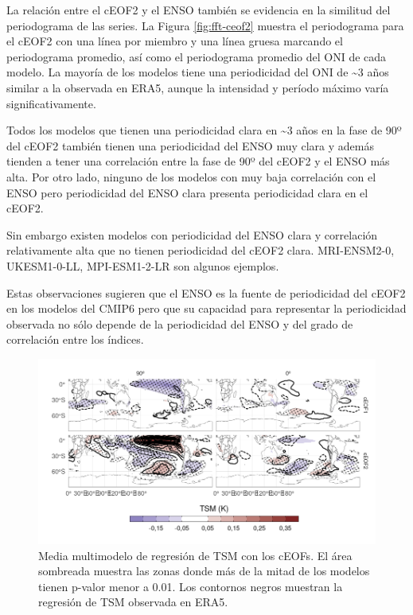 \documentclass[12pt,oneside,a4paper]{reedthesis}
\begin{document}
La relación entre el cEOF2 y el ENSO también se evidencia en la similitud del periodograma de las series.
La Figura \ref{fig:fft-ceof2} muestra el periodograma para el cEOF2 con una línea por miembro y una línea gruesa marcando el periodograma promedio, así como el periodograma promedio del ONI de cada modelo.
La mayoría de los modelos tiene una periodicidad del ONI de \textasciitilde3 años similar a la observada en ERA5, aunque la intensidad y período máximo varía significativamente.

Todos los modelos que tienen una periodicidad clara en \textasciitilde3 años en la fase de 90º del cEOF2 también tienen una periodicidad del ENSO muy clara y además tienden a tener una correlación entre la fase de 90º del cEOF2 y el ENSO más alta.
Por otro lado, ninguno de los modelos con muy baja correlación con el ENSO pero periodicidad del ENSO clara presenta periodicidad clara en el cEOF2.

Sin embargo existen modelos con periodicidad del ENSO clara y correlación relativamente alta que no tienen periodicidad del cEOF2 clara.
MRI-ENSM2-0, UKESM1-0-LL, MPI-ESM1-2-LR son algunos ejemplos.

Estas observaciones sugieren que el ENSO es la fuente de periodicidad del cEOF2 en los modelos del CMIP6 pero que su capacidad para representar la periodicidad observada no sólo depende de la periodicidad del ENSO y del grado de correlación entre los índices.



\begin{figure}

{\centering \includegraphics{figures/50-cmip6/sst-mmm-1} 

}

\caption{Media multimodelo de regresión de TSM con los cEOFs. El área sombreada muestra las zonas donde más de la mitad de los modelos tienen p-valor menor a 0.01. Los contornos negros muestran la regresión de TSM observada en ERA5.}\label{fig:sst-mmm}
\end{figure}
\end{document}
